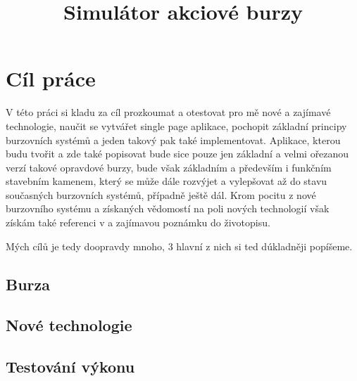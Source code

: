 \documentclass[thesis=M,czech]{FITthesis}[2012/06/26]
\title{Simulátor akciové burzy}
\begin{document}

\begin{introduction}


	
\end{introduction}

\chapter{Cíl práce}

V této práci si kladu za cíl prozkoumat a otestovat pro mě nové a zajímavé technologie, naučit se vytvářet single page aplikace, pochopit základní principy burzovních systémů a jeden takový pak také implementovat. Aplikace, kterou budu tvořit a zde také popisovat bude sice pouze jen základní a velmi ořezanou verzí takové opravdové burzy, bude však základním a především i funkčním stavebním kamenem, který se může dále rozvýjet a vylepšovat až do stavu současných burzovních systémů, případně ještě dál. Krom pocitu z nové burzovního systému a získaných vědomostí na poli nových technologií však získám také referenci v a zajímavou poznámku do životopisu.

Mých cílů je tedy doopravdy mnoho, 3 hlavní z nich si ted dúkladněji popíšeme.


\section{Burza}
\section{Nové technologie}
\section{Testování výkonu}

\end{document}
